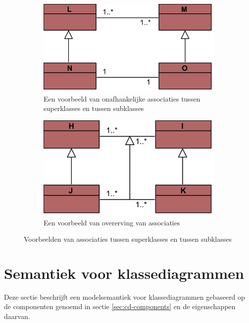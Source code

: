 \begin{figure}
	\centering
	\begin{subfigure}{0.4\textwidth}
		\includegraphics[width=\textwidth]{chap-consistentie/assoc-hier.png}
		\caption{Een voorbeeld van onafhankelijke associaties tussen superklasses en tussen subklasses}
		\label{fig:assoc-hier}
	\end{subfigure}
	\hfill
	\begin{subfigure}{0.4\textwidth}
		\vspace{-0.2cm}
		\includegraphics[width=\textwidth]{chap-consistentie/assoc-gen.png}
		\caption{Een voorbeeld van overerving van associaties}
		\label{fig:assoc-gen}
	\end{subfigure}
	\caption{Voorbeelden van associaties tussen superklasses en tussen subklasses}
	\label{fig:assoc-hier-gen}
\end{figure}

\section{Semantiek voor klassediagrammen}\label{sec:cd-semantics}

Deze sectie beschrijft een modelsemantiek voor klassediagrammen gebaseerd op de componenten genoemd in sectie \ref{sec:cd-components} en de eigenschappen daarvan.

